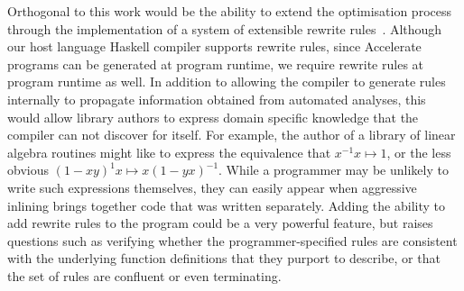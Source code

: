 Orthogonal to this work would be the ability to extend the optimisation process
through the implementation of a system of extensible rewrite
rules~\cite{Jones:2001wm}. Although our host language Haskell compiler supports
rewrite rules, since Accelerate programs can be generated at program runtime, we
require rewrite rules at program runtime as well. In addition to allowing the
compiler to generate rules internally to propagate information obtained from
automated analyses, this would allow library authors to express domain specific
knowledge that the compiler can not discover for itself. For example, the author
of a library of linear algebra routines might like to express the equivalence
that $x^{-1}x \mapsto 1$, or the less obvious $\left( 1 - x y \right)^{1}x
\mapsto x \left( 1 - y x \right)^{-1}$. While a programmer may be unlikely to
write such expressions themselves, they can easily appear when aggressive
inlining brings together code that was written separately. Adding the ability to
add rewrite rules to the program could be a very powerful feature, but raises
questions such as verifying whether the programmer-specified rules are
consistent with the underlying function definitions that they purport to
describe, or that the set of rules are confluent or even terminating.


%

